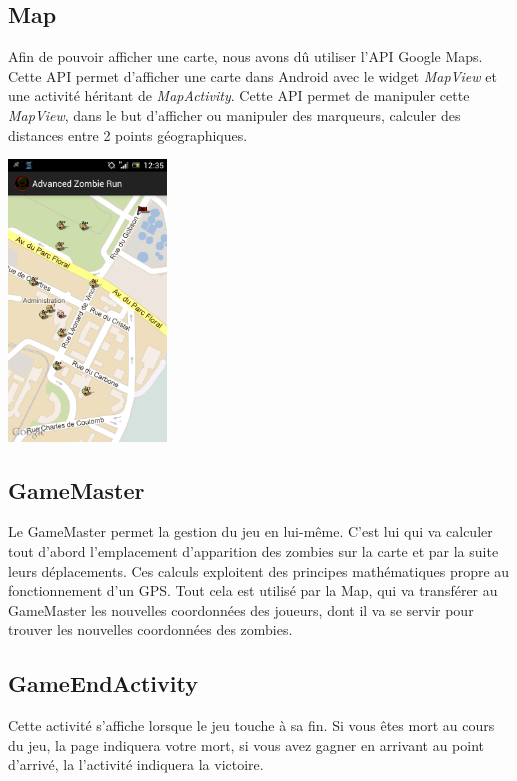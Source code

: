 \documentclass{article}
\begin{document}
\subsection{Map}

Afin de pouvoir afficher une carte, nous avons dû utiliser l'API Google Maps. Cette API permet d'afficher une carte dans Android avec le widget \emph{MapView} et une activité héritant de \emph{MapActivity}. Cette API permet de manipuler cette \emph{MapView}, dans le but d'afficher ou manipuler des marqueurs, calculer des distances entre 2 points géographiques.   

\vfill
\begin{center} 
\includegraphics[width=4.2cm, height=7.cm]{game.png}
\end{center}
\vfill

\subsection{GameMaster}

Le GameMaster permet la gestion du jeu en lui-même. C'est lui qui va calculer tout d'abord l'emplacement d'apparition des zombies sur la carte et par la suite leurs déplacements. Ces calculs exploitent des principes mathématiques propre au fonctionnement d'un GPS. Tout cela est utilisé par la Map, qui va transférer au GameMaster les nouvelles coordonnées des joueurs, dont il va se servir pour trouver les nouvelles coordonnées des zombies.

\subsection{GameEndActivity}

Cette activité s'affiche lorsque le jeu touche à sa fin. Si vous êtes mort au cours du jeu, la page indiquera votre mort, si vous avez gagner en arrivant au point d'arrivé, la l'activité indiquera la victoire.
\end{document}
